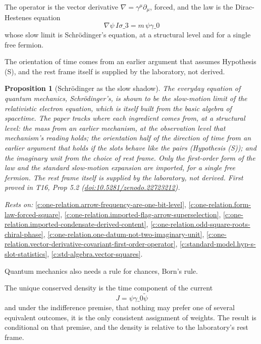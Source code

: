 \documentclass[11pt]{article}
\newtheorem{proposition}[theorem]{Proposition}
\theoremstyle{definition}
\theoremstyle{plain}
\begin{document}
The operator is the vector derivative $\nabla = \gamma^{\mu}\partial_{\mu}$, forced, and the law is the Dirac-Hestenes equation \[ \nabla\psi\, I\sigma\_{3} = m\,\psi\gamma\_{0} \] whose slow limit is Schrödinger's equation, at a structural level and for a single free fermion.

The orientation of time comes from an earlier argument that assumes Hypothesis (S), and the rest frame itself is supplied by the laboratory, not derived.

\begin{proposition}[Schrödinger as the slow shadow]\label{c:one-relation.schr-odinger-slow-shadow}
The everyday equation of quantum mechanics, Schr\"odinger's, is shown to be the slow-motion limit of the relativistic electron equation, which is itself built from the basic algebra of spacetime. The paper tracks where each ingredient comes from, at a structural level: the mass from an earlier mechanism, at the observation level that mechanism's reading holds; the orientation half of the direction of time from an earlier argument that holds if the slots behave like the pairs (Hypothesis (S)); and the imaginary unit from the choice of rest frame. Only the first-order form of the law and the standard slow-motion expansion are imported, for a single free fermion. The rest frame itself is supplied by the laboratory, not derived.
\emph{First proved in} T16, Prop 5.2 (\href{https://doi.org/10.5281/zenodo.22723212}{doi:10.5281/zenodo.22723212}).
\end{proposition}
\noindent\emph{Rests on:} \ref{c:one-relation.arrow-frequency-are-one-bit-level}, \ref{c:one-relation.form-law-forced-square}, \ref{c:one-relation.imported-flag-arrow-superselection}, \ref{c:one-relation.imported-condensate-derived-content}, \ref{c:one-relation.odd-square-roots-chiral-phase}, \ref{c:one-relation.one-datum-not-two-imaginary-unit}, \ref{c:one-relation.vector-derivative-covariant-first-order-operator}, \ref{c:standard-model.hyp-s-slot-statistics}, \ref{c:std-algebra.vector-squares}.

Quantum mechanics also needs a rule for chances, Born's rule.

The unique conserved density is the time component of the current \[ J = \psi\gamma\_{0}\tilde{\psi} \] and under the indifference premise, that nothing may prefer one of several equivalent outcomes, it is the only consistent assignment of weights. The result is conditional on that premise, and the density is relative to the laboratory's rest frame.
\end{document}
